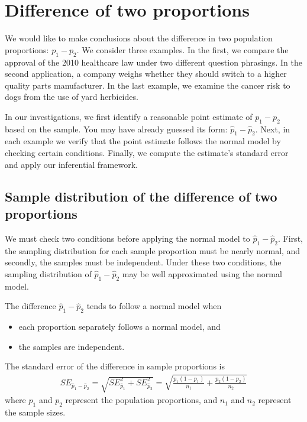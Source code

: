 \section{Difference of two proportions}
\label{differenceOfTwoProportions}

We would like to make conclusions about the difference in two population proportions: $p_1 - p_2$. We consider three examples. In the first, we compare the approval of the 2010 healthcare law under two different question phrasings. In the second application, a company weighs whether they should switch to a higher quality parts manufacturer. In the last example, we examine the cancer risk to dogs from the use of yard herbicides.

In our investigations, we first identify a reasonable point estimate of $p_1 - p_2$ based on the sample. You may have already guessed its form: $\hat{p}_1 - \hat{p}_2$. Next, in each example we verify that the point estimate follows the normal model by checking certain conditions. Finally, we compute the estimate's standard error and apply our inferential framework.


\subsection{Sample distribution of the difference of two proportions}

We must check two conditions before applying the normal model to $\hat{p}_1 - \hat{p}_2$. First, the sampling distribution for each sample proportion must be nearly normal, and secondly, the samples must be independent. Under these two conditions, the sampling distribution of $\hat{p}_1 - \hat{p}_2$ may be well approximated using the normal model.

\begin{termBox}{
The difference $\hat{p}_1 - \hat{p}_2$ tends to follow a normal model when
\begin{itemize}
\setlength{\itemsep}{0mm}
\item each proportion separately follows a normal model, and
\item the samples are independent.
\end{itemize}
The standard error of the difference in sample proportions is
\begin{eqnarray}
SE_{\hat{p}_1 - \hat{p}_2}
	= \sqrt{SE_{\hat{p}_1}^2 + SE_{\hat{p}_2}^2}
	= \sqrt{\frac{p_1(1-p_1)}{n_1} + \frac{p_2(1-p_2)}{n_2}}
\label{seForDiffOfProp}
\end{eqnarray}
where $p_1$ and $p_2$ represent the population proportions, and $n_1$ and $n_2$ represent the sample sizes.}
\end{termBox}


